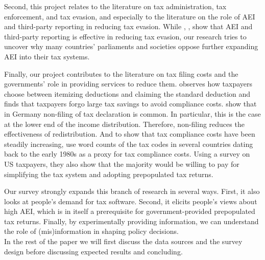 \documentclass[11pt]{article}
\begin{document}
Second, this project relates to the literature on tax administration, tax enforcement, and tax evasion, and especially to the literature on the role of AEI and third-party reporting in reducing tax evasion. While \textcite{kleven2011unwilling}, \textcite{pomeranz2015no}, \textcite{slemrod2017does} show that AEI and third-party reporting is effective in reducing tax evasion, our research tries to uncover why many countries' parliaments and societies oppose further expanding AEI into their tax systems. 

Finally, our project contributes to the literature on tax filing costs and the governments' role in providing services to reduce them. \textcite{benzarti2020taxing} observes how taxpayers choose between itemizing deductions and claiming the standard deduction and finds that taxpayers forgo large tax savings to avoid compliance costs. \textcite{hauck2024optional} show that in Germany non-filing of tax declaration is common. In particular, this is the case at the lower end of the income distribution. Therefore, non-filing reduces the effectiveness of redistribution. And to show that tax compliance costs have been steadily increasing, \textcite{benzarti2024rising} use word counts of the tax codes in several countries dating back to the early 1980s as a proxy for tax compliance costs. Using a survey on US taxpayers, they also show that the majority would be willing to pay for simplifying the tax system and adopting prepopulated tax returns. 

Our survey strongly expands this branch of research in several ways. First, it also looks at people's demand for tax software. Second, it elicits people's views about high AEI, which is in itself a prerequisite for government-provided prepopulated tax returns. Finally, by experimentally providing information, we can understand the role of (mis)information in shaping policy decisions.  \\[1em] 
In the rest of the paper we will first discuss the data sources and the survey design before discussing expected results and concluding. 
\end{document}
